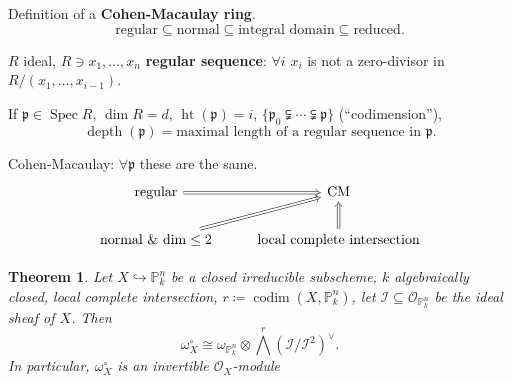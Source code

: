 \documentclass[12pt]{article}
\DeclareMathOperator{\Spec}{Spec}
\DeclareMathOperator{\codim}{codim}
\DeclareMathOperator{\height}{ht}
\DeclareMathOperator{\depth}{depth}
\newtheorem*{theorem}{Theorem}
\theoremstyle{definition}
\theoremstyle{remark}
\newtheorem*{comment}{Comment}
\begin{document}
\begin{comment}
They didn't have the language of schemes. They realised that they had a short exact sequence, where the space of functions gave conditions on the middle variety, and the quotient on the third position didn't have the dimension corresponding to the difference. In our terminology, we say that taking global sections is not exact and we need cohomology. The exact sequence they had
\[0\longrightarrow\mathcal{F}\otimes\mathcal{L}^{-q}\longrightarrow\cdots\otimes\mathcal{L}^{-q}\longrightarrow\cdots\otimes\mathcal{L}^{-q}\longrightarrow0\]
corresponds to the current
\[0\longrightarrow H^0(\mathcal{F})\longrightarrow H^0(\cdots)\longrightarrow H^0(\cdots)\longrightarrow\]
\end{comment}

Definition of a \textbf{Cohen-Macaulay ring}.
\[\text{regular}\subseteq\text{normal}\subseteq\text{integral domain}\subseteq\text{reduced}.\]

$R$ ideal, $R\ni x_1,\ldots,x_n$ \textbf{regular sequence}: $\forall i$ $x_i$ is not a zero-divisor in $R/(x_1,\ldots,x_{i-1})$.

If $\mathfrak{p}\in\Spec R$, $\dim R=d$, $\height(\mathfrak{p})=i$, $\{\mathfrak{p}_0\subsetneqq\cdots\subsetneqq\mathfrak{p}\}$ (``codimension''),
\[\depth(\mathfrak{p})=\text{maximal length of a regular sequence in }\mathfrak{p}.\]

Cohen-Macaulay: $\forall\mathfrak{p}$ these are the same.
\[
\begin{tikzcd}
\text{regular}\arrow[r,Rightarrow]&\text{CM}\\
\text{normal \& dim}\leq2\arrow[ru,Rightarrow]&\text{local complete intersection}\arrow[u,Rightarrow]
\end{tikzcd}
\]

\begin{theorem}
Let $X\hookrightarrow\mathbb{P}_k^n$ be a closed irreducible subscheme, $k$ algebraically closed, local complete intersection, $r\coloneqq\codim(X,\mathbb{P}_k^n)$, let $\mathcal{I}\subseteq\mathcal{O}_{\mathbb{P}_k^n}$ be the ideal sheaf of $X$. Then
\[\omega_X^{\circ}\cong\omega_{\mathbb{P}_k^n}\otimes{\bigwedge}^r(\mathcal{I}/\mathcal{I}^2)^{\vee}.\]
In particular, $\omega_X^{\circ}$ is an invertible $\mathcal{O}_X$-module
\end{theorem}

\begin{comment}
``Local complete intersection'' means that $X$ can be given locally by $r$ equations. Being of codimension $r$ means just that at least $r$ equations are needed. With this assumption, every point has an open neighbourhood where $r$ equations are enough.
\end{comment}
\end{document}
